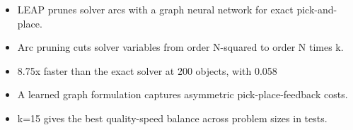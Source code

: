 
\begin{itemize}
\item LEAP prunes solver arcs with a graph neural network for exact pick-and-place.
\item Arc pruning cuts solver variables from order N-squared to order N times k.
\item 8.75x faster than the exact solver at 200 objects, with 0.058%
\item A learned graph formulation captures asymmetric pick-place-feedback costs.
\item k=15 gives the best quality-speed balance across problem sizes in tests.
\end{itemize}

